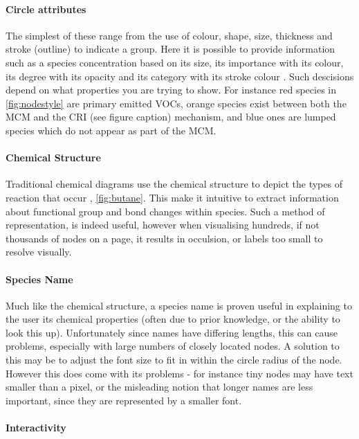 \paragraph*{\color{c4}Circle attributes}



The simplest of these range from the use of colour, shape, size, thickness and stroke (outline) to indicate a group. Here it is possible to provide information such as a species concentration based on its size, its importance with its colour, its degree with its opacity and its category with its stroke colour \citep{colourb,rightness}. Such descisions depend on what properties you are trying to show. For instance red species in \autoref{fig:nodestyle} are primary emitted VOCs, orange species exist between both the MCM and the CRI (see figure caption) mechanism, and blue ones are lumped species which do not appear as part of the MCM.  


\paragraph*{\color{c1}Chemical Structure}
Traditional chemical diagrams use the chemical structure to depict the types of reaction that occur , \autoref{fig:butane}. This make it intuitive to extract information about functional group and bond changes within species. Such a method of representation, is indeed useful, however when visualising hundreds, if not thousands of nodes on a page, it results in occulsion, or labels too small to resolve visually. 

\paragraph*{\color{c2}Species Name}

Much like the chemical structure, a species name is proven useful in explaining to the user its chemical properties (often due to prior knowledge, or the ability to look this up). Unfortunately since names have differing lengths, this can cause problems, especially with large numbers of closely located nodes. A solution to this may be to adjust the font size to fit in within the circle radius of the node. However this does come with its problems - for instance tiny nodes may have text smaller than a pixel, or the misleading notion that longer names are less important, since they are represented by a smaller font. 


\paragraph*{\color{c3}Interactivity}

